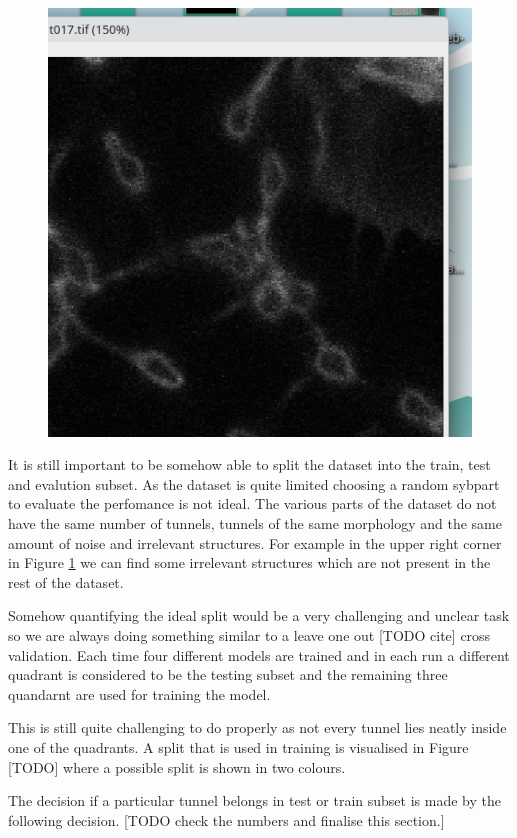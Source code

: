 \documentclass[
  digital,     %
  oneside,     %
  nosansbold,  %
  nocolorbold, %
  lof,         %
  lot,         %
]{fithesis4}
\begin{document}
\begin{figure}
    \begin{center}
        \includegraphics[width=0.6\linewidth]{resources/tmp/t017_upperright.png}
    \end{center}
    \caption{}
    \label{fig:upperright}
\end{figure}

It is still important to be somehow able to split the dataset into the train,
test and evalution subset. As the dataset is quite limited choosing a random
sybpart to evaluate the perfomance is not ideal. The various parts of the
dataset do not have the same number of tunnels, tunnels of the same morphology
and the same amount of noise and irrelevant structures. For example in the upper
right corner in Figure \ref{fig:upperright} we can find some irrelevant
structures which are not present in the rest of the dataset.

Somehow quantifying the ideal split would be a very challenging and unclear task
so we are always doing something similar to a leave one out [TODO cite] cross
validation. Each time four different models are trained and in each run a
different quadrant is considered to be the testing subset and the remaining
three quandarnt are used for training the model.

This is still quite challenging to do properly as not every tunnel lies neatly
inside one of the quadrants. A split that is used in training is visualised in
Figure [TODO] where a possible split is shown in two colours.

The decision if a particular tunnel belongs in test or train subset is made by
the following decision. [TODO check the numbers and finalise this section.]
\end{document}

